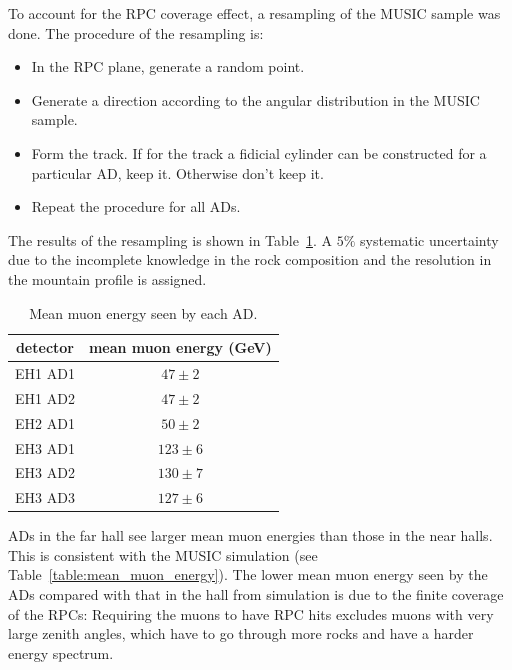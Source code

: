 To account for the RPC coverage effect, a resampling of the MUSIC sample was done. The procedure of the resampling is:
\begin{itemize}
	\item In the RPC plane, generate a random point.
	\item Generate a direction according to the angular distribution in the MUSIC sample.
	\item Form the track. If for the track a fidicial cylinder can be constructed for a particular AD, keep it. Otherwise don't keep it.
	\item Repeat the procedure for all ADs.
\end{itemize}
The results of the resampling is shown in Table~\ref{tab:mean_muon_energy}. A $5\%$ systematic uncertainty due to the incomplete knowledge in the rock composition and the resolution in the mountain profile is assigned.
\begin{table}
	\centering
	\begin{tabular}{|c|c|}
		\hline
		detector & mean muon energy (GeV) \\
		\hline
		EH1 AD1 & $47\pm 2$ \\
		\hline
		EH1 AD2 & $47\pm 2$ \\
		\hline
		EH2 AD1 & $50\pm 2$ \\
		\hline
		EH3 AD1 & $123\pm 6$ \\
		\hline
		EH3 AD2 & $130\pm 7$ \\
		\hline
		EH3 AD3 & $127\pm 6$ \\
		\hline
	\end{tabular}
	\caption{Mean muon energy seen by each AD.}
	\label{tab:mean_muon_energy}
\end{table}
ADs in the far hall see larger mean muon energies than those in the near halls. This is consistent with the MUSIC simulation (see Table~\ref{table:mean_muon_energy}). The lower mean muon energy seen by the ADs compared with that in the hall from simulation is due to the finite coverage of the RPCs: Requiring the muons to have RPC hits excludes muons with very large zenith angles, which have to go through more rocks and have a harder energy spectrum.


